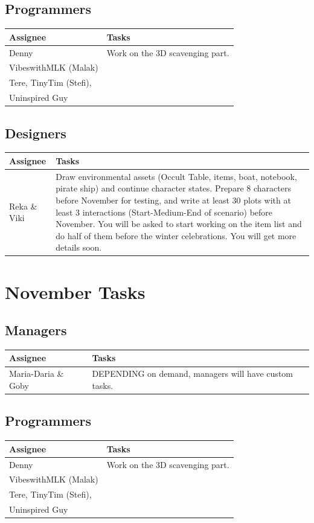 \documentclass[11pt,a4paper]{article}
\begin{document}
\subsection*{Programmers}
\begin{tabularx}{\textwidth}{@{} l X @{}}
\toprule
\textbf{Assignee} & \textbf{Tasks} \\
\midrule
Denny & Work on the 3D scavenging part. \\
\midrule
VibeswithMLK (Malak) &\\
\midrule
Tere, TinyTim (Stefi), & \\
Uninspired Guy & \\
\bottomrule
\end{tabularx}

\subsection*{Designers}
\begin{tabularx}{\textwidth}{@{} l X @{}}
\toprule
\textbf{Assignee} & \textbf{Tasks} \\
\midrule
Reka \& Viki & Draw environmental assets (Occult Table, items, boat, notebook, pirate ship) and continue character states. Prepare 8 characters before November for testing, and write at least 30 plots with at least 3 interactions (Start-Medium-End of scenario) before November. You will be asked to start working on the item list and do half of them before the winter celebrations. You will get more details soon.\\
\bottomrule
\end{tabularx}


\vspace{1cm}
\section*{November Tasks}

\subsection*{Managers}
\begin{tabularx}{\textwidth}{@{} l X @{}}
\toprule
\textbf{Assignee} & \textbf{Tasks} \\
\midrule
Maria-Daria \& Goby & DEPENDING on demand, managers will have custom tasks. \\
\bottomrule
\end{tabularx}

\subsection*{Programmers}
\begin{tabularx}{\textwidth}{@{} l X @{}}
\toprule
\textbf{Assignee} & \textbf{Tasks} \\
\midrule
Denny & Work on the 3D scavenging part. \\
\midrule
VibeswithMLK (Malak) & \\
\midrule
Tere, TinyTim (Stefi), &\\
Uninspired Guy & \\
\bottomrule
\end{tabularx}
\end{document}
